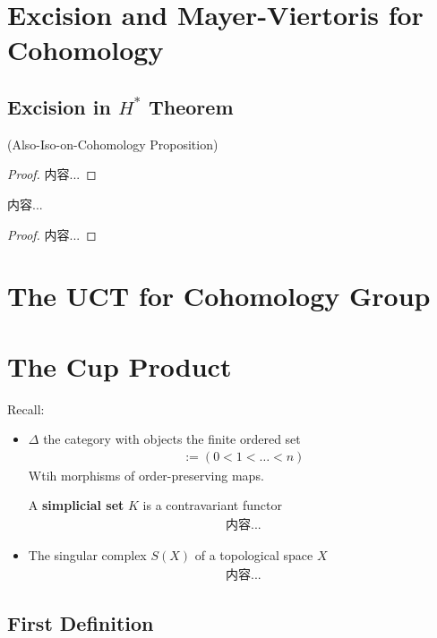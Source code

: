 \documentclass[Total.tex]{subfiles}
\begin{document}
			\section{Excision and Mayer-Viertoris for Cohomology}
				\subsection{Excision in $H^*$ Theorem}
					\begin{proposition}
						(Also-Iso-on-Cohomology Proposition)
					\end{proposition}
					\begin{proof}
						内容...
					\end{proof}
					\begin{theorem}
						内容...
					\end{theorem}
					\begin{proof}
						内容...
					\end{proof}
			\section{The UCT for Cohomology Group}
			\section{The Cup Product}
			Recall:
			\begin{itemize}
				\item $\Delta$ the category with objects the finite ordered set
				\begin{gather*}
					[n]:=(0<1<\dots<n)
				\end{gather*}
				Wtih morphisms of order-preserving maps.
				
				A \textbf{simplicial set} $K$ is a contravariant functor
				\begin{gather*}
					内容...
				\end{gather*}
				\item The singular complex $S(X)$ of a topological space $X$
				\begin{gather*}
					内容...
				\end{gather*}
			\end{itemize}
			\subsection{First Definition}
\end{document}
